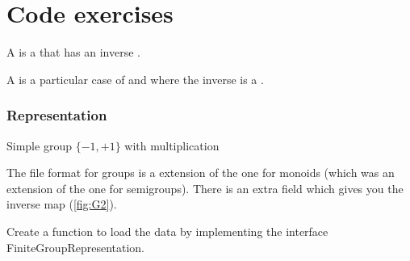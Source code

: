 \section{\usebox{\chaptergear}
  Code exercises}

A \Group is a \Monoid that has an inverse \Mapping.


A \FiniteGroup is a particular case of \Group and \FiniteMonoid where the inverse is a \FiniteMap.


\subsubsection*{Representation}

\begin{marginfigure}%
    \caption{Simple group $\{-1,+1\}$ with multiplication}%
    \label{fig:G2}%
\end{marginfigure}%

The file format for groups is a extension of the one for monoids (which was an extension of the one for semigroups).
There is an extra field  which gives you the inverse map (\cref{fig:G2}).

\begin{codeexercise}
    Create a function to load the data by implementing the interface FiniteGroupRepresentation.
\end{codeexercise}


